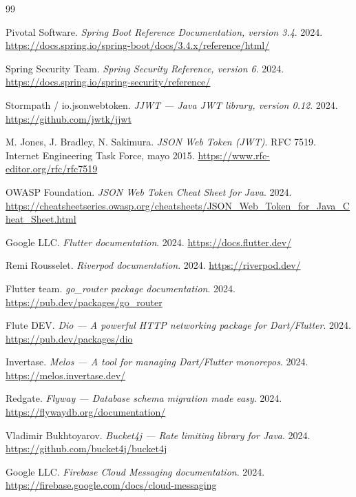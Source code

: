 \documentclass[12pt,a4paper,twoside]{report}
\begin{document}
\begin{thebibliography}{99}

Pivotal Software.
\textit{Spring Boot Reference Documentation, version 3.4}.
2024.
\url{https://docs.spring.io/spring-boot/docs/3.4.x/reference/html/}

Spring Security Team.
\textit{Spring Security Reference, version 6}.
2024.
\url{https://docs.spring.io/spring-security/reference/}

Stormpath / io.jsonwebtoken.
\textit{JJWT — Java JWT library, version 0.12}.
2024.
\url{https://github.com/jwtk/jjwt}

M. Jones, J. Bradley, N. Sakimura.
\textit{JSON Web Token (JWT)}.
RFC 7519.
Internet Engineering Task Force, mayo 2015.
\url{https://www.rfc-editor.org/rfc/rfc7519}

OWASP Foundation.
\textit{JSON Web Token Cheat Sheet for Java}.
2024.
\url{https://cheatsheetseries.owasp.org/cheatsheets/JSON_Web_Token_for_Java_Cheat_Sheet.html}

Google LLC.
\textit{Flutter documentation}.
2024.
\url{https://docs.flutter.dev/}

Remi Rousselet.
\textit{Riverpod documentation}.
2024.
\url{https://riverpod.dev/}

Flutter team.
\textit{go\_router package documentation}.
2024.
\url{https://pub.dev/packages/go_router}

Flute DEV.
\textit{Dio — A powerful HTTP networking package for Dart/Flutter}.
2024.
\url{https://pub.dev/packages/dio}

Invertase.
\textit{Melos — A tool for managing Dart/Flutter monorepos}.
2024.
\url{https://melos.invertase.dev/}

Redgate.
\textit{Flyway — Database schema migration made easy}.
2024.
\url{https://flywaydb.org/documentation/}

Vladimir Bukhtoyarov.
\textit{Bucket4j — Rate limiting library for Java}.
2024.
\url{https://github.com/bucket4j/bucket4j}

Google LLC.
\textit{Firebase Cloud Messaging documentation}.
2024.
\url{https://firebase.google.com/docs/cloud-messaging}


\end{thebibliography}
\end{document}
